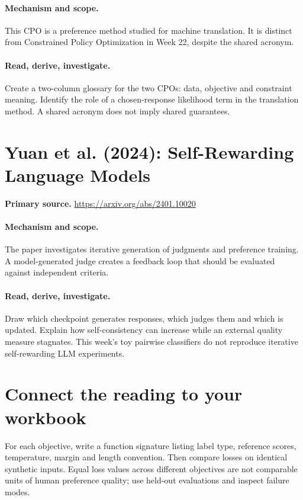 \documentclass[11pt]{scrartcl}
\begin{document}
\paragraph{Mechanism and scope.} This CPO is a preference method studied for machine translation. It is distinct from Constrained Policy Optimization in Week 22, despite the shared acronym.

\paragraph{Read, derive, investigate.} Create a two-column glossary for the two CPOs: data, objective and constraint meaning. Identify the role of a chosen-response likelihood term in the translation method. A shared acronym does not imply shared guarantees.

\section{Yuan et al. (2024): Self-Rewarding Language Models}
\noindent\textbf{Primary source.} \url{https://arxiv.org/abs/2401.10020}

\paragraph{Mechanism and scope.} The paper investigates iterative generation of judgments and preference training. A model-generated judge creates a feedback loop that should be evaluated against independent criteria.

\paragraph{Read, derive, investigate.} Draw which checkpoint generates responses, which judges them and which is updated. Explain how self-consistency can increase while an external quality measure stagnates. This week's toy pairwise classifiers do not reproduce iterative self-rewarding LLM experiments.

\section*{Connect the reading to your workbook}
For each objective, write a function signature listing label type, reference scores, temperature, margin and length convention. Then compare losses on identical synthetic inputs. Equal loss values across different objectives are not comparable units of human preference quality; use held-out evaluations and inspect failure modes.
\end{document}

